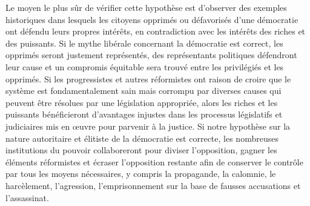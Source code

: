 Le moyen le plus sûr de vérifier cette hypothèse est d'observer des exemples historiques dans lesquels les citoyens opprimés ou défavorisés d'une démocratie ont défendu leurs propres intérêts, en contradiction avec les intérêts des riches et des puissants. Si le mythe libérale concernant la démocratie est correct, les opprimés seront justement représentés, des représentants politiques défendront leur cause et un compromis équitable sera trouvé entre les privilégiés et les opprimés. Si les progressistes et autres réformistes ont raison de croire que le système est fondamentalement sain mais corrompu par diverses causes qui peuvent être résolues par une législation appropriée, alors les riches et les puissants bénéficieront d'avantages injustes dans les processus législatifs et judiciaires mis en œuvre pour parvenir à la justice. Si notre hypothèse sur la nature autoritaire et élitiste de la démocratie est correcte, les nombreuses institutions du pouvoir collaboreront pour diviser l'opposition, gagner les éléments réformistes et écraser l'opposition restante afin de conserver le contrôle par tous les moyens nécessaires, y compris la propagande, la calomnie, le harcèlement, l'agression, l'emprisonnement sur la base de fausses accusations et l'assassinat.

